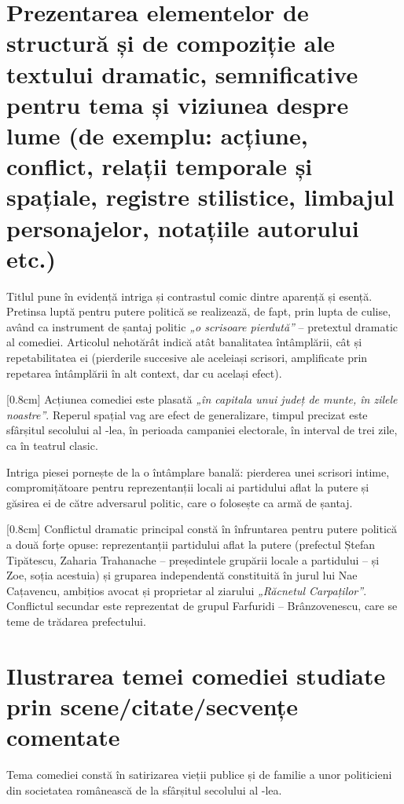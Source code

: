 \section{Prezentarea elementelor de structură și de compoziție ale textului dramatic, semnificative pentru tema și viziunea despre lume {\footnotesize\normalfont(de exemplu: acțiune, conflict, relații temporale și spațiale, registre stilistice, limbajul personajelor, notațiile autorului etc.)}}

Titlul pune în evidență intriga și contrastul comic dintre aparență și esență. Pretinsa luptă pentru putere politică se realizează, de fapt, prin lupta de culise, având ca instrument de șantaj politic \textit{„o scrisoare pierdută”} -- pretextul dramatic al comediei. Articolul nehotărât indică atât banalitatea întâmplării, cât și repetabilitatea ei (pierderile succesive ale aceleiași scrisori, amplificate prin repetarea întâmplării în alt context, dar cu același efect).

[0.8cm]
Acțiunea comediei este plasată \textit{„în capitala unui județ de munte, în zilele noastre”}. Reperul spațial vag are efect de generalizare, timpul precizat este sfârșitul secolului al -lea, în perioada campaniei electorale, în interval de trei zile, ca în teatrul clasic.

Intriga piesei pornește de la o întâmplare banală: pierderea unei scrisori intime, compromițătoare pentru reprezentanții locali ai partidului aflat la putere și găsirea ei de către adversarul politic, care o folosește ca armă de șantaj.

[0.8cm]
Conflictul dramatic principal constă în înfruntarea pentru putere politică a două forțe opuse: reprezentanții partidului aflat la putere (prefectul Ștefan Tipătescu, Zaharia Trahanache -- președintele grupării locale a partidului -- și Zoe, soția acestuia) și gruparea independentă constituită în jurul lui Nae Cațavencu, ambițios avocat și proprietar al ziarului \textit{„Răcnetul Carpaților”}. Conflictul secundar este reprezentat de grupul Farfuridi -- Brânzovenescu, care se teme de trădarea prefectului.


\section{Ilustrarea temei comediei studiate prin scene/citate/sec\-ven\-țe comentate}

Tema comediei constă în satirizarea vieții publice și de familie a unor politicieni din societatea românească de la sfârșitul secolului al -lea.

